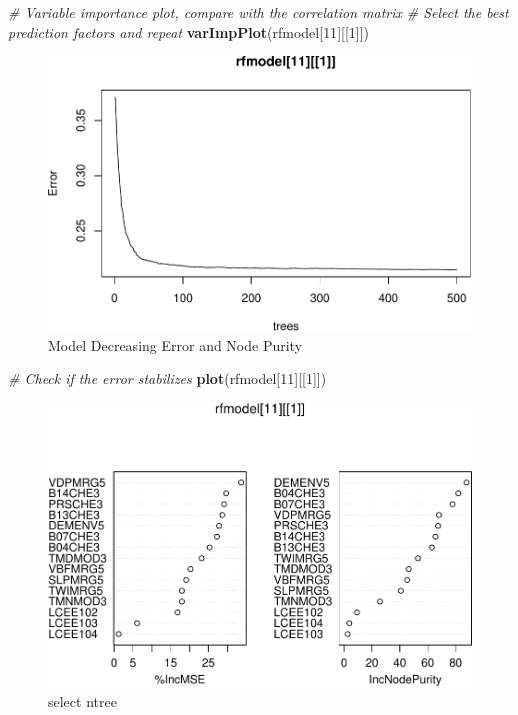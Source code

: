 \documentclass[10pt,b5paper,]{book}
\newenvironment{Shaded}{\begin{snugshade}}{\end{snugshade}}
\newcommand{\CommentTok}[1]{\textcolor[rgb]{0.56,0.35,0.01}{\textit{#1}}}
\newcommand{\DecValTok}[1]{\textcolor[rgb]{0.00,0.00,0.81}{#1}}
\newcommand{\KeywordTok}[1]{\textcolor[rgb]{0.13,0.29,0.53}{\textbf{#1}}}
\newcommand{\NormalTok}[1]{#1}
\theoremstyle{definition}
\theoremstyle{definition}
\theoremstyle{definition}
\theoremstyle{remark}
\begin{document}
\begin{Shaded}
\begin{Highlighting}[]
\CommentTok{# Variable importance plot, compare with the correlation matrix}
\CommentTok{# Select the best prediction factors and repeat  }
\KeywordTok{varImpPlot}\NormalTok{(rfmodel[}\DecValTok{11}\NormalTok{][[}\DecValTok{1}\NormalTok{]])}
\end{Highlighting}
\end{Shaded}

\begin{figure}
\centering
\includegraphics{SOCMapping_files/figure-latex/unnamed-chunk-60-1.pdf}
\caption{\label{fig:unnamed-chunk-60}Model Decreasing Error and Node Purity}
\end{figure}

\begin{Shaded}
\begin{Highlighting}[]
\CommentTok{# Check if the error stabilizes }
\KeywordTok{plot}\NormalTok{(rfmodel[}\DecValTok{11}\NormalTok{][[}\DecValTok{1}\NormalTok{]])}
\end{Highlighting}
\end{Shaded}

\begin{figure}
\centering
\includegraphics{SOCMapping_files/figure-latex/unnamed-chunk-61-1.pdf}
\caption{\label{fig:unnamed-chunk-61}select ntree}
\end{figure}
\end{document}
